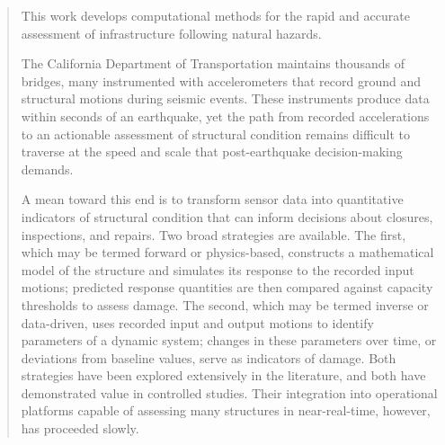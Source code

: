
\begin{abstract}

This work develops computational methods for the rapid and accurate assessment of infrastructure following natural hazards.



The California Department of Transportation maintains thousands of bridges, many instrumented with accelerometers that record ground and structural motions during seismic events.
These instruments produce data within seconds of an earthquake, yet the path from recorded accelerations to an actionable assessment of structural condition remains difficult to traverse at the speed and scale that post-earthquake decision-making demands. 

A mean toward this end is to transform sensor data into quantitative indicators of structural condition that can inform decisions about closures, inspections, and repairs.
Two broad strategies are available.
The first, which may be termed forward or physics-based, constructs a mathematical model of the structure and simulates its response to the recorded input motions; predicted response quantities are then compared against capacity thresholds to assess damage.
The second, which may be termed inverse or data-driven, uses recorded input and output motions to identify parameters of a dynamic system; changes in these parameters over time, or deviations from baseline values, serve as indicators of damage.
Both strategies have been explored extensively in the literature, and both have demonstrated value in controlled studies. 
Their integration into operational platforms capable of assessing many structures in near-real-time, however, has proceeded slowly.


\end{abstract}
